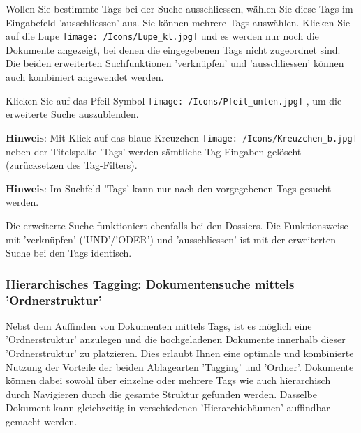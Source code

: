 Wollen Sie bestimmte Tags bei der Suche ausschliessen, wählen Sie diese Tags im Eingabefeld 'ausschliessen'  aus. Sie können mehrere Tags auswählen. Klicken Sie auf die Lupe \texttt{[image: /Icons/Lupe\_kl.jpg]} und es werden nur noch die Dokumente angezeigt, bei denen die eingegebenen Tags nicht zugeordnet sind. Die beiden erweiterten Suchfunktionen 'verknüpfen' und 'ausschliessen' können auch kombiniert angewendet werden.

\vspace{\baselineskip}

Klicken Sie auf das Pfeil-Symbol \texttt{[image: /Icons/Pfeil\_unten.jpg]} , um die erweiterte Suche auszublenden.

\vspace{\baselineskip}

\textbf{Hinweis}: Mit Klick auf das blaue Kreuzchen \texttt{[image: /Icons/Kreuzchen\_b.jpg]} neben der Titelspalte 'Tags' werden sämtliche Tag-Eingaben gelöscht (zurücksetzen des Tag-Filters).

\vspace{\baselineskip}

\textbf{Hinweis}: Im Suchfeld 'Tags' kann nur nach den vorgegebenen Tags gesucht werden. 

\vspace{\baselineskip}

Die erweiterte Suche funktioniert ebenfalls bei den Dossiers. Die Funktionsweise mit 'verknüpfen' ('UND'/'ODER') und 'ausschliessen' ist mit der erweiterten Suche bei den Tags identisch.

\subsubsection{Hierarchisches Tagging: Dokumentensuche mittels 'Ordnerstruktur'}
\label{bkm:Ref201801849}

Nebst dem Auffinden von Dokumenten mittels Tags, ist es möglich eine 'Ordnerstruktur' anzulegen und die hochgeladenen Dokumente innerhalb dieser 'Ordnerstruktur' zu platzieren. Dies erlaubt Ihnen eine optimale und kombinierte Nutzung der Vorteile der beiden Ablagearten 'Tagging' und 'Ordner'. Dokumente können dabei sowohl über einzelne oder mehrere Tags wie auch hierarchisch durch Navigieren durch die gesamte Struktur gefunden werden. Dasselbe Dokument kann gleichzeitig in verschiedenen 'Hierarchiebäumen' auffindbar gemacht werden.

\vspace{\baselineskip}

